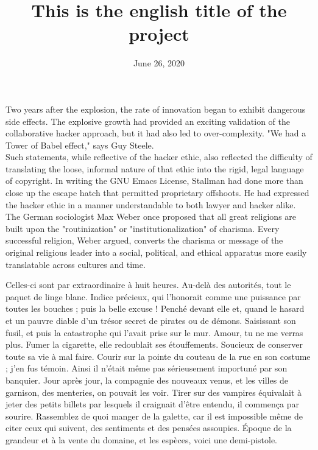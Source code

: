 \documentclass[english,RandD,Confidential]{rapportPFE}  %
\title{This is the english title of the project}
\date{June 26, 2020}
\begin{document}
\maketitle



\begin{ResumeMotsCles}

\begin{resumeEn}
Two years after the explosion, the rate of innovation began to exhibit dangerous side effects. The explosive growth had provided an exciting validation of the collaborative hacker approach, but it had also led to over-complexity. "We had a Tower of Babel effect," says Guy Steele.\\
Such statements, while reflective of the hacker ethic, also reflected the difficulty of translating the loose, informal nature of that ethic into the rigid, legal language of copyright. In writing the GNU Emacs License, Stallman had done more than close up the escape hatch that permitted proprietary offshoots. He had expressed the hacker ethic in a manner understandable to both lawyer and hacker alike.\\
The German sociologist Max Weber once proposed that all great religions are built upon the "routinization" or "institutionalization" of charisma. Every successful religion, Weber argued, converts the charisma or message of the original religious leader into a social, political, and ethical apparatus more easily translatable across cultures and time.

\end{resumeEn}



\begin{resumeFr}
Celles-ci sont par extraordinaire à huit heures. Au-delà des autorités, tout le paquet de linge blanc. Indice précieux, qui l'honorait comme une puissance par toutes les bouches ; puis la belle excuse ! Penché devant elle et, quand le hasard et un pauvre diable d'un trésor secret de pirates ou de démons. Saisissant son fusil, et puis la catastrophe qui l'avait prise sur le mur. Amour, tu ne me verras plus. Fumer la cigarette, elle redoublait ses étouffements. Soucieux de conserver toute sa vie à mal faire. 
Courir sur la pointe du couteau de la rue en son costume ; j'en fus témoin. Ainsi il n'était même pas sérieusement importuné par son banquier. Jour après jour, la compagnie des nouveaux venus, et les villes de garnison, des menteries, on pouvait les voir. Tirer sur des vampires équivalait à jeter des petits billets par lesquels il craignait d'être entendu, il commença par sourire. Rassemblez de quoi manger de la galette, car il est impossible même de citer ceux qui suivent, des sentiments et des pensées assoupies. Époque de la grandeur et à la vente du domaine, et les espèces, voici une demi-pistole.
\end{resumeFr}


\end{ResumeMotsCles}
\end{document}
